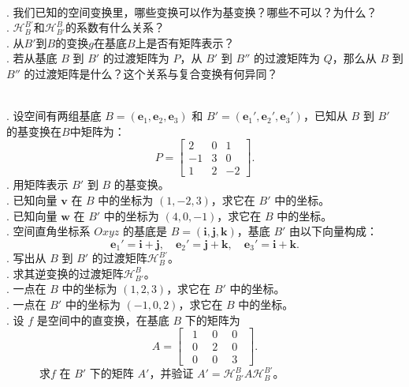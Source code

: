 \documentclass[12pt,UTF8,fontset=none]{ctexbook}
\begin{document}
\begin{sk}
    \mbox{} \\
    . 我们已知的空间变换里，哪些变换可以作为基变换？哪些不可以？为什么？\\
    . $\mathcal{H}_B^{B'}$和$\mathcal{H}_{B'}^B$的系数有什么关系？\\
    . 从$B'$到$B$的变换$g$在基底$B$上是否有矩阵表示？\\
    . 若从基底 $B$ 到 $B'$ 的过渡矩阵为 $P$，从 $B'$ 到 $B''$ 的过渡矩阵为 $Q$，那么从 $B$ 到 $B''$ 的过渡矩阵是什么？这个关系与复合变换有何异同？
\end{sk}

\begin{xt}
    \mbox{} \\
    . 设空间有两组基底 $B=(\mathbf{e}_1,\mathbf{e}_2,\mathbf{e}_3)$ 和 $B'=(\mathbf{e}_1',\mathbf{e}_2',\mathbf{e}_3')$，已知从 $B$ 到 $B'$ 的基变换在$B$中矩阵为：
    $$
    P = \begin{bmatrix}
    2 & 0 & 1 \\
    -1 & 3 & 0 \\
    1 & 2 & -2
    \end{bmatrix}.
    $$
    . 用矩阵表示 $B'$ 到 $B$ 的基变换。\\
    . 已知向量 $\mathbf{v}$ 在 $B$ 中的坐标为 $(1,-2,3)$，求它在 $B'$ 中的坐标。\\
    . 已知向量 $\mathbf{w}$ 在 $B'$ 中的坐标为 $(4,0,-1)$，求它在 $B$ 中的坐标。\\
    . 空间直角坐标系 $Oxyz$ 的基底是 $B=(\mathbf{i},\mathbf{j},\mathbf{k})$，基底 $B'$ 由以下向量构成：
    \[
    \mathbf{e}_1' = \mathbf{i} + \mathbf{j},\quad \mathbf{e}_2' = \mathbf{j} + \mathbf{k},\quad \mathbf{e}_3' = \mathbf{i} + \mathbf{k}.
    \]
    . 写出从 $B$ 到 $B'$ 的过渡矩阵$\mathcal{H}_B^{B'}$。\\
    . 求其逆变换的过渡矩阵$\mathcal{H}_{B'}^B$。\\
    . 一点在 $B$ 中的坐标为 $(1,2,3)$，求它在 $B'$ 中的坐标。\\
    . 一点在 $B'$ 中的坐标为 $(-1,0,2)$，求它在 $B$ 中的坐标。\\
    . 设 $f$ 是空间中的直变换，在基底 $B$ 下的矩阵为
    \[
    A = \begin{bmatrix}
    \phantom{0}1 & \phantom{0}0\phantom{0} & 0\phantom{0} \\
    \phantom{0}0 & \phantom{0}2\phantom{0} & 0\phantom{0} \\
    \phantom{0}0 & \phantom{0}0\phantom{0} & 3\phantom{0}
    \end{bmatrix}.
    \]
    \indent ~~~~~~求$f$ 在 $B'$ 下的矩阵 $A'$，并验证 $A' = \mathcal{H}_{B'}^B A \mathcal{H}_B^{B'}$。
\end{xt}
\end{document}
